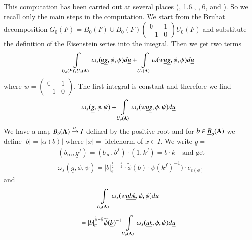 This computation has been carried out at several places (\cite{art2-key6}, 1.6., \cite{art2-key11}, 6, and \cite{art2-key13}). So we recall only the main steps in the computation. We start from the Bruhat decomposition $G_{0}(F)=B_{0}(F)\cup B_{0}(F)\left(\begin{smallmatrix} 0 & 1\\ -1 & 0\end{smallmatrix}\right)U_{0}(F)$ and substitute the definition of the Eisenstein series into the integral. Then we get two terms
$$
\int\limits_{U_{o}(F)\backslash U_{o}(\mathbf{A})}\omega_{s}(\underline{u}\underline{g},\phi,\psi)d\underline{u}+\int\limits_{U_{o}(\mathbf{A})}\omega(w\underline{u}\underline{g},\phi,\psi)d\underline{u}
$$
where $w=\left(\begin{smallmatrix} 0 & 1\\ -1 & 0\end{smallmatrix}\right)$. The first integral is constant and therefore we find
$$
\omega_{s}(\underline{g},\phi,\psi)+\int\limits_{U_{o}(\mathbf{A})}\omega_{s}(w\underline{u}\underline{g},\phi,\psi)d\underline{u}
$$
We have a map $B_{o}(\mathbf{A})\xrightarrow{\alpha}I$ defined by the positive root and for $b\in \underline{B}_{o}(\mathbf{A})$ we define $|\underline{b}|=|\alpha(\underline{b})|$ where $|\underline{x}|=$ idelenorm of $\underline{x}\in I$. We write $\underline{g}=$
\begin{align*}
& (b_{\infty},\underline{g}^{f})=(b_{\infty},\underline{b}^{f})\cdot (1,\underline{k}^{f})=\underline{b}\cdot \underline{k} \text{~~ and get}\\
& \omega_{s}(\underline{g},\phi,\psi)=|\underline{b}|_{\mathbb{C}}^{\frac{1}{2}+\frac{s}{2}}\cdot \widetilde{\phi}(\underline{b})\cdot \psi(\underline{k}^{f})^{-1})\cdot e_{\epsilon(\phi)}
\end{align*}
and
\begin{gather*}
\int\limits_{U_{o}(\mathbf{A})}\omega_{s}(w\underline{u}\underline{b}\underline{k},\phi,\psi)du\\[4pt]
=|b|_{\mathbb{C}}^{\frac{1}{2}-\frac{s}{2}}\widetilde{\phi}(\underline{b})^{-1}\int\limits_{U_{o}(\mathbf{A})}\omega_{s}(\underline{u}\underline{k},\phi,\psi)d\underline{u}
\end{gather*}

